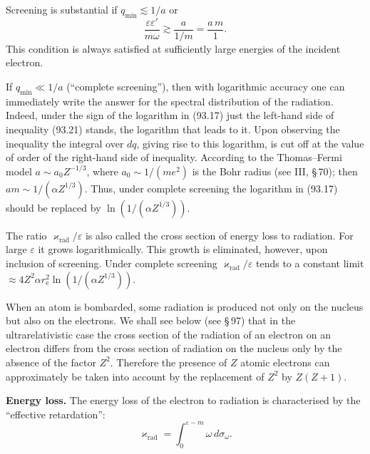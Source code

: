 
Screening is substantial if $q_\text{min} \lesssim 1/a$ or
\begin{equation}
\frac{\varepsilon\varepsilon'}{m\omega} \gtrsim \frac{a}{1/m} = \frac{a\,m}{1}.
\label{eq:93.21}
\end{equation}
This condition is always satisfied at sufficiently large energies of the incident electron.

If $q_\text{min} \ll 1/a$ (``complete screening''), then with logarithmic accuracy one can immediately write the answer for the spectral distribution of the radiation. Indeed, under the sign of the logarithm in (93.17) just the left-hand side of inequality (93.21) stands, the logarithm that leads to it. Upon observing the inequality the integral over $dq$, giving rise to this logarithm, is cut off at the value of order of the right-hand side of inequality. According to the Thomas--Fermi model $a \sim a_0 Z^{-1/3}$, where $a_0 \sim 1/(me^2)$ is the Bohr radius (see III, \S\,70); then $am \sim 1/(\alpha Z^{1/3})$. Thus, under complete screening the logarithm in (93.17) should be replaced by $\ln(1/(\alpha Z^{1/3}))$.

The ratio $\varkappa_\text{rad}/\varepsilon$ is also called the cross section of energy loss to radiation. For large $\varepsilon$ it grows logarithmically. This growth is eliminated, however, upon inclusion of screening. Under complete screening $\varkappa_\text{rad}/\varepsilon$ tends to a constant limit $\approx 4Z^2\alpha r_\mathrm{e}^2\ln(1/(\alpha Z^{1/3}))$.

When an atom is bombarded, some radiation is produced not only on the nucleus but also on the electrons. We shall see below (see \S\,97) that in the ultrarelativistic case the cross section of the radiation of an electron on an electron differs from the cross section of radiation on the nucleus only by the absence of the factor $Z^2$. Therefore the presence of $Z$ atomic electrons can approximately be taken into account by the replacement of $Z^2$ by $Z(Z+1)$.

\textbf{Energy loss.} The energy loss of the electron to radiation is characterised by the ``effective retardation'':
\begin{equation}
\varkappa_\text{rad} = \int_0^{\varepsilon-m} \omega\,d\sigma_\omega.
\label{eq:93.22}
\end{equation}

